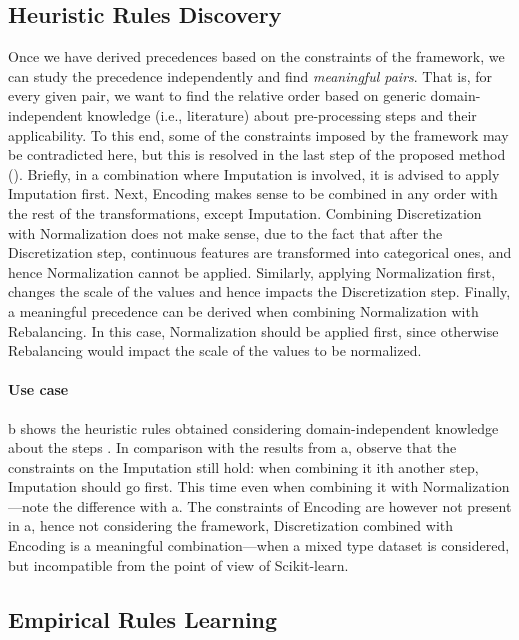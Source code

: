 \subsection{Heuristic Rules Discovery}
\label{effective-ssec:rules-heuristics}
Once we have derived precedences based on the constraints of the framework, we can study the precedence independently and find \textit{meaningful pairs}.
That is, for every given pair, we want to find the relative order based on generic domain-independent knowledge (i.e., literature) about pre-processing steps and their applicability.
To this end, some of the constraints imposed by the framework may be contradicted here, but this is resolved in the last step of the proposed method ().
Briefly, in a combination where Imputation is involved, it is advised to apply Imputation first.
Next, Encoding makes sense to be combined in any order with the rest of the transformations, except Imputation.
Combining Discretization with Normalization does not make sense, due to the fact that after the Discretization step, continuous features are transformed into categorical ones, and hence Normalization cannot be applied.
Similarly, applying Normalization first, changes the scale of the values and hence impacts the Discretization step.
Finally, a meaningful precedence can be derived when combining Normalization with Rebalancing.
In this case, Normalization should be applied first, since otherwise Rebalancing would impact the scale of the values to be normalized.

\paragraph{Use case}
b shows the heuristic rules obtained considering domain-independent knowledge about the steps \cite{BookExploratoryDM03Dasu}.
In comparison with the results from a, observe that the constraints on the Imputation still hold: when combining it ith another step, Imputation should go first.
This time even when combining it with Normalization---note the difference with a.
The constraints of Encoding are however not present in a, hence not considering the framework, Discretization combined with Encoding is a meaningful combination---when a mixed type dataset is considered, but incompatible from the point of view of Scikit-learn.

\subsection{Empirical Rules Learning}
\label{effective-ssec:rules-learned}

